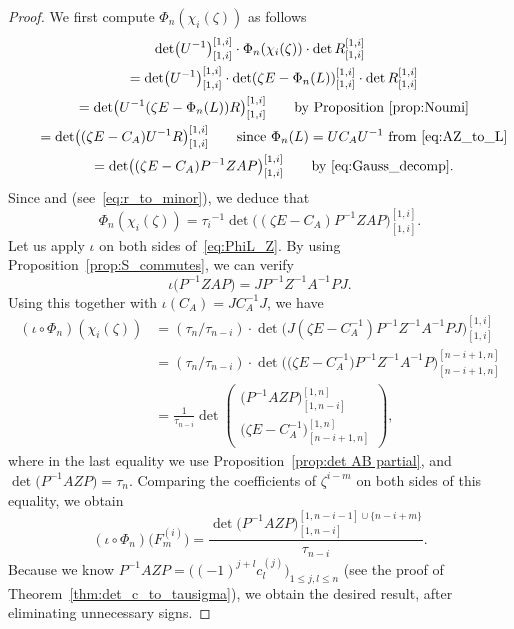 \documentclass[10pt,a4paper]{amsart}
\numberwithin{equation}{section}
\theoremstyle{definition}
\begin{document}
 \begin{proof}
We first compute $\Phi_n(\chi_i(\zeta))$ as follows
\begin{gather*}
\det\bigl(U^{-1}\bigr)_{[1,i]}^{[1,i]}\cdot
\Phi_n(\chi_i(\zeta))
\cdot\det R_{[1,i]}^{[1,i]}\\
\qquad=
\det\bigl(U^{-1}\bigr)_{[1,i]}^{[1,i]}\cdot
\det(\zeta E-\Phi_n(L))_{[1,i]}^{[1,i]}
\cdot\det R_{[1,i]}^{[1,i]}\\
\qquad=
\det\bigl( U^{-1}(\zeta E-\Phi_n(L))R\bigr)_{[1,i]}^{[1,i]}\qquad\text{by Proposition~\ref{prop:Noumi}}
\\
\qquad=
\det\bigl((\zeta E-C_A) U^{-1}R\bigr)_{[1,i]}^{[1,i]}
\qquad\text{since $\Phi_n(L)=UC_AU^{-1}$ from
\eqref{eq:AZ_to_L}}\\
\qquad={\det\bigl((\zeta E-C_A)P^{-1}ZAP\bigr)_{[1,i]}^{[1,i]}} \qquad\text{by~\eqref{eq:Gauss_decomp}}.
\end{gather*}
Since  and
 (see~\eqref{eq:r_to_minor}), we deduce that
\begin{equation}\label{eq:PhiL_Z}
\Phi_n(\chi_i(\zeta))
={\tau_i}^{-1}{\det\bigl((\zeta E-C_A)P^{-1}ZAP\bigr)_{[1,i]}^{[1,i]}}.
\end{equation}
Let us apply $\iota$ on both sides of~\eqref{eq:PhiL_Z}.
By using Proposition~\ref{prop:S_commutes}, we can verify
\[
\iota\bigl(P^{-1}ZAP\bigr)=
JP^{-1}Z^{-1}A^{-1}PJ.
\]
Using this together with $\iota(C_A)=JC_A^{-1}J$, we have
\begin{align*}
(\iota\circ \Phi_n)(\chi_i(\zeta))
&=(\tau_n/\tau_{n-i})\cdot{\det\bigl(J(\zeta E-C_A^{-1})P^{-1}Z^{-1}A^{-1}PJ\bigr)_{[1,i]}^{[1,i]}}\\
&=(\tau_n/\tau_{n-i})\cdot\det\bigl(\bigl(\zeta E-C_A^{-1}\bigr)P^{-1}Z^{-1}A^{-1}P\bigr)_{[n-i+1,n]}^{[n-i+1,n]}\\
&=\frac{1}{\tau_{n-i}}
\det\left(
\begin{matrix}
\bigl(P^{-1}AZP\bigr)_{[1,n-i]}^{[1,n]}\\
\hline
\bigl(\zeta E-C_A^{-1}\bigr)_{[n-i+1,n]}^{[1,n]}
\end{matrix}
\right),
\end{align*}
where in the
last equality we use Proposition~\ref{prop:det AB partial}, and $\det\bigl(P^{-1}AZP\bigr)=\tau_n$.
Comparing the coefficients of $\zeta^{i-m}$ on both sides of this equality, we obtain
\[
(\iota\circ\Phi_n)\bigl(F^{(i)}_m\bigr)=
\frac{\det\bigl(P^{-1}AZP\bigr)_{[1,n-i]}^{[1,n-i-1]\cup\{n-i+m\}}}{\tau_{n-i}}.
\]
Because we know $P^{-1}AZP=\bigl((-1)^{j+l}c^{(j)}_{l}\bigr)_{1\le j,l\le n}$ (see the proof of Theorem~\ref{thm:det_c_to_tausigma}), we obtain the desired result, after eliminating unnecessary signs.
\end{proof}
\end{document}
